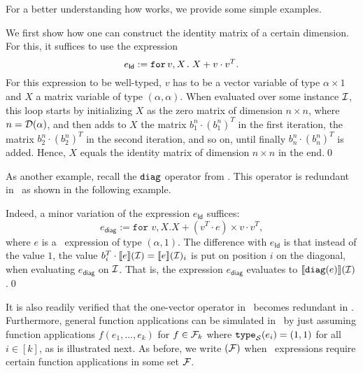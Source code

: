 For a better understanding how \langfor  works, we provide some simple examples.
\begin{example}
We first show how one can construct the identity matrix of a certain dimension. For this, it suffices to use the expression $$e_{\mathsf{Id}}:=\texttt{for}\, v,X \texttt{.}\, X + v\cdot v^T.$$ For this expression to be well-typed, $v$ has to be a vector variable of type $\alpha\times 1$ and $X$ a matrix variable of type $(\alpha,\alpha)$. When evaluated over some instance $\mathcal{I}$, this loop starts by initializing $X$ as the zero matrix of dimension $n\times n$, where $n=\mathcal{D}(\alpha)$, and then adds to $X$ the matrix $b_1^n\cdot (b_1^n)^T$ in the first iteration, the matrix $b_2^n\cdot (b_2^n)^T$ in the second iteration, and so on, until finally $b_n^n\cdot (b_n^n)^T$ is added. Hence, $X$ equals the identity matrix of dimension $n\times n$ in the end.\qed
\end{example}
As another example, recall the $\texttt{diag}$ operator from \lang.	This operator is redundant in \langfor\ as shown in the following example.
\begin{example}
Indeed, a minor variation of the expression $e_{\mathsf{Id}}$ suffices:
$$e_{\mathsf{diag}}:=\texttt{for } v, X. X + (v^T\cdot e) \times v\cdot v^T,$$ where $e$ is a \langfor\  expression of type $(\alpha,1)$. The difference with $e_{\mathsf{Id}}$ is that instead of the value $1$, the value 
$b_i^T\cdot\llbracket e \rrbracket(\mathcal{I})=\llbracket e \rrbracket(\mathcal{I})_{i}$ is put on position $i$ on the diagonal, when evaluating $e_{\mathsf{diag}}$ on $\mathcal{I}$.
That is, the expression $e_{\mathsf{diag}}$ evaluates to $\llbracket \texttt{diag}(e) \rrbracket(\mathcal{I})$.\qed
\end{example}
It is also readily verified that the one-vector operator in \lang\ becomes redundant in \langfor. Furthermore, general function applications can be simulated in \langfor\ by just assuming function applications $f(e_1,\ldots,e_k)$ for $f\in\mathcal{F}_k$ where $\texttt{type}_{\mathcal{S}}(e_i)=(1,1)$ for all $i\in[k]$, as is illustrated next.
As before, we write \langfor$(\mathcal{F})$ when \langfor\ expressions require certain function applications in some set $\mathcal{F}$.

